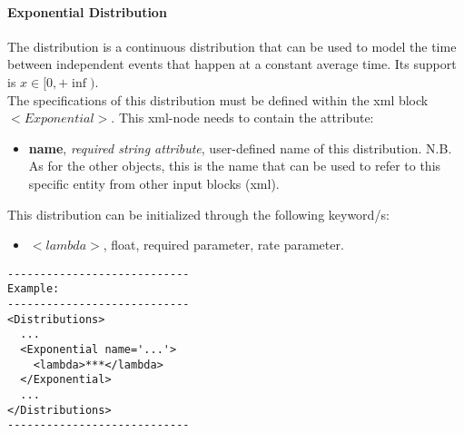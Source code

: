 \paragraph{Exponential Distribution}
\label{Exponential}
The  distribution is a continuous distribution that can be used to model the time between independent events that
happen at a constant average time.  Its support is $x \in [0, +\inf)$.
\\ The specifications of this distribution must be defined within the xml block $<Exponential>$. This xml-node needs to contain the attribute:
\vspace{-5mm}
\begin{itemize}
\itemsep0em
\item \textbf{name}, \textit{required string attribute}, user-defined name of this distribution. N.B. As for the other objects, this is the name that can be used to refer to this specific entity from other input blocks (xml).   
\end{itemize}
\vspace{-5mm}
This distribution can be initialized through the following keyword/s:
\begin{itemize}
\item $<lambda>$, float, required parameter,  rate parameter.
\end{itemize}

\begin{lstlisting}[style=XML]
----------------------------
Example:
----------------------------
<Distributions>
  ...
  <Exponential name='...'>
    <lambda>***</lambda>
  </Exponential>
  ...
</Distributions>
----------------------------
\end{lstlisting}


